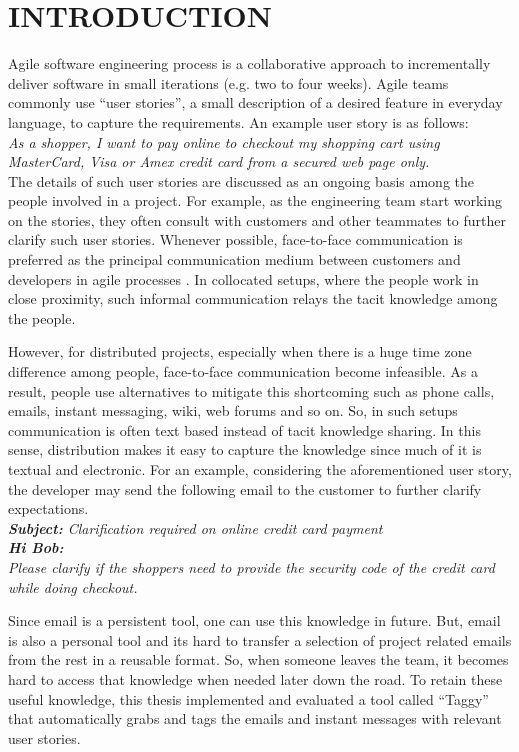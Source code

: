 \fancyhead[RO,LE]{\thepage}
\fancyfoot{} 
\chapter{INTRODUCTION}
Agile software engineering process is a collaborative approach to incrementally deliver software in small iterations (e.g. two to four weeks). Agile teams commonly use ``user stories'', a small description of a desired feature in everyday language, to capture the requirements. An example user story is as follows:\\
\emph{As a shopper, I want to pay online to checkout my shopping cart using MasterCard, Visa or Amex credit card from a secured web page only.}\\

The details of such user stories are discussed as an ongoing basis among the people involved in a project. For example, as the engineering team start working on the stories, they often consult with customers and other teammates to further clarify such user stories. Whenever possible, face-to-face communication is preferred as the principal communication medium between customers and developers in agile processes \cite{am} \cite{xp} \cite{scrum} \cite{xp_up}. In collocated setups, where the people work in close proximity, such informal communication relays the tacit knowledge among the people. 

However, for distributed projects, especially when there is a huge time zone difference among people, face-to-face communication become infeasible. As a result, people use alternatives to mitigate this shortcoming such as phone calls, emails, instant messaging, wiki, web forums and so on. So, in such setups communication is often text based instead of tacit knowledge sharing. In this sense, distribution makes it easy to capture the knowledge since much of it is textual and electronic. For an example, considering the aforementioned user story, the developer may send the following email to the customer to further clarify expectations.\\
\emph{\textbf{Subject:} Clarification required on online credit card payment\\
\textbf{Hi Bob:}\\
Please clarify if the shoppers need to provide the security code of the credit card while doing checkout.}

Since email is a persistent tool, one can use this knowledge in future. But, email is also a personal tool and its hard to transfer a selection of project related emails from the rest in a reusable format. So, when someone leaves the team, it becomes hard to access that knowledge when needed later down the road. To retain these useful knowledge, this thesis implemented and evaluated a tool called ``Taggy'' that automatically grabs and tags the emails and instant messages with relevant user stories.


